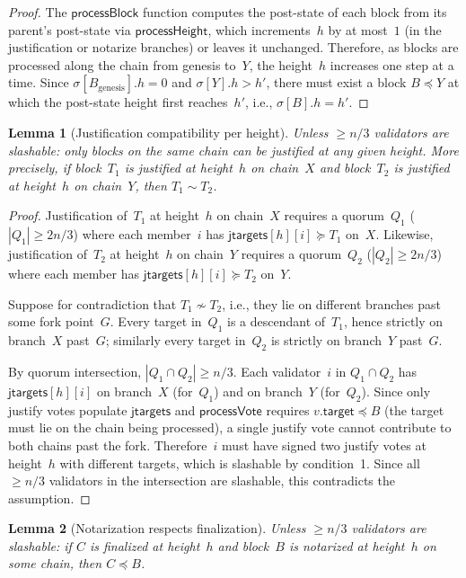 \documentclass{article}
\newcommand{\target}{\mathsf{target}}
\newcommand{\jtargets}{\mathsf{jtargets}}
\theoremstyle{plain}
\newtheorem{lemma}{Lemma}
\theoremstyle{definition}
\theoremstyle{remark}
\begin{document}
\begin{proof}
The $\textsf{processBlock}$ function computes the post-state of each block from its parent's post-state via $\textsf{processHeight}$, which increments~$h$ by at most~$1$ (in the justification or notarize branches) or leaves it unchanged.
Therefore, as blocks are processed along the chain from genesis to~$Y$, the height~$h$ increases one step at a time.
Since $\sigma[B_\mathrm{genesis}].h = 0$ and $\sigma[Y].h > h'$, there must exist a block $B \preceq Y$ at which the post-state height first reaches~$h'$, i.e., $\sigma[B].h = h'$.
\end{proof}

\begin{lemma}[Justification compatibility per height]\label{lem:uniqueness}
Unless $\geq n/3$ validators are slashable: only blocks on the same chain can be justified at any given height.
More precisely, if block~$T_1$ is justified at height~$h$ on chain~$X$ and block~$T_2$ is justified at height~$h$ on chain~$Y$, then $T_1 \sim T_2$.
\end{lemma}

\begin{proof}
Justification of~$T_1$ at height~$h$ on chain~$X$ requires a quorum~$Q_1$ ($|Q_1| \geq 2n/3$) where each member~$i$ has $\jtargets[h][i] \succeq T_1$ on~$X$.
Likewise, justification of~$T_2$ at height~$h$ on chain~$Y$ requires a quorum~$Q_2$ ($|Q_2| \geq 2n/3$) where each member has $\jtargets[h][i] \succeq T_2$ on~$Y$.

Suppose for contradiction that $T_1 \not\sim T_2$, i.e., they lie on different branches past some fork point~$G$.
Every target in~$Q_1$ is a descendant of~$T_1$, hence strictly on branch~$X$ past~$G$; similarly every target in~$Q_2$ is strictly on branch~$Y$ past~$G$.

By quorum intersection, $|Q_1 \cap Q_2| \geq n/3$.
Each validator~$i$ in $Q_1 \cap Q_2$ has $\jtargets[h][i]$ on branch~$X$ (for~$Q_1$) and on branch~$Y$ (for~$Q_2$).
Since only justify votes populate $\jtargets$ and $\textsf{processVote}$ requires $v.\target \preceq B$ (the target must lie on the chain being processed), a single justify vote cannot contribute to both chains past the fork.
Therefore~$i$ must have signed two justify votes at height~$h$ with different targets, which is slashable by condition~1.
Since all $\geq n/3$ validators in the intersection are slashable, this contradicts the assumption.
\end{proof}

\begin{lemma}[Notarization respects finalization]\label{lem:finexclude}
Unless $\geq n/3$ validators are slashable: if $C$ is finalized at height~$h$ and block~$B$ is notarized at height~$h$ on some chain, then $C \preceq B$.
\end{lemma}
\end{document}
